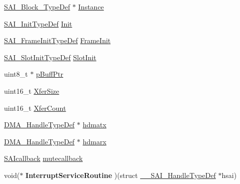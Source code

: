 \begin{DoxyCompactItemize}
\item 
\hyperlink{struct_s_a_i___block___type_def}{S\+A\+I\+\_\+\+Block\+\_\+\+Type\+Def} $\ast$ \hyperlink{struct_____s_a_i___handle_type_def_a8f544698ef87977771b016fcd75d2ac0}{Instance}
\item 
\hyperlink{struct_s_a_i___init_type_def}{S\+A\+I\+\_\+\+Init\+Type\+Def} \hyperlink{struct_____s_a_i___handle_type_def_a184047822e47fc9bacb9e77b8d733081}{Init}
\item 
\hyperlink{struct_s_a_i___frame_init_type_def}{S\+A\+I\+\_\+\+Frame\+Init\+Type\+Def} \hyperlink{struct_____s_a_i___handle_type_def_a2942d66875489996442c31fb646ff701}{Frame\+Init}
\item 
\hyperlink{struct_s_a_i___slot_init_type_def}{S\+A\+I\+\_\+\+Slot\+Init\+Type\+Def} \hyperlink{struct_____s_a_i___handle_type_def_a31541010b7ce773d32f5b2b48dc1bbe1}{Slot\+Init}
\item 
uint8\+\_\+t $\ast$ \hyperlink{struct_____s_a_i___handle_type_def_a2c2504bbb7be8c14347157bbc4fae837}{p\+Buff\+Ptr}
\item 
uint16\+\_\+t \hyperlink{struct_____s_a_i___handle_type_def_a8f3114ca6990b3c9efafcdd76c8e21f2}{Xfer\+Size}
\item 
uint16\+\_\+t \hyperlink{struct_____s_a_i___handle_type_def_abef6c492c344416c607ddf6bcd0869ac}{Xfer\+Count}
\item 
\hyperlink{group___d_m_a___exported___types_ga41b754a906b86bce54dc79938970138b}{D\+M\+A\+\_\+\+Handle\+Type\+Def} $\ast$ \hyperlink{struct_____s_a_i___handle_type_def_a206dffa30475f86c45b5b749d96d969a}{hdmatx}
\item 
\hyperlink{group___d_m_a___exported___types_ga41b754a906b86bce54dc79938970138b}{D\+M\+A\+\_\+\+Handle\+Type\+Def} $\ast$ \hyperlink{struct_____s_a_i___handle_type_def_aeca9733265dacfb8368acab06ca5fa0d}{hdmarx}
\item 
\hyperlink{group___s_a_i___exported___types_ga957c3e6366add9a5d3c516ceb0ed8058}{S\+A\+Icallback} \hyperlink{struct_____s_a_i___handle_type_def_a91ba06a7ba7902471441ded24bb51262}{mutecallback}
\item 
void($\ast$ {\bfseries Interrupt\+Service\+Routine} )(struct \hyperlink{struct_____s_a_i___handle_type_def}{\+\_\+\+\_\+\+S\+A\+I\+\_\+\+Handle\+Type\+Def} $\ast$hsai)\hypertarget{struct_____s_a_i___handle_type_def_a6af795b63cc8d7b6c38f375e6a3b9ecf}{}\label{struct_____s_a_i___handle_type_def_a6af795b63cc8d7b6c38f375e6a3b9ecf}


\end{DoxyCompactItemize}

